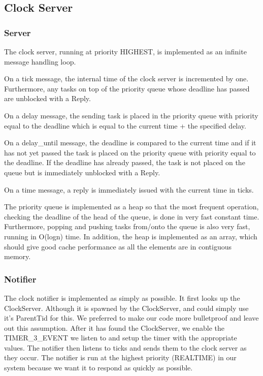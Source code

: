 \documentclass{article}
\begin{document}
\subsection{Clock Server}

\subsubsection{Server}
The clock server, running at priority HIGHEST, is implemented as an infinite message handling loop. 

On a tick message, the internal time of the clock server is incremented by one. Furthermore, any tasks on top of the priority queue whose deadline has passed are unblocked with a Reply.

On a delay message, the sending task is placed in the priority queue with priority equal to the deadline which is equal to the current time + the specified delay.

On a delay\_until message, the deadline is compared to the current time and if it has not yet passed the task is placed on the priority queue with priority equal to the deadline. If the deadline has already passed, the task is not placed on the queue but is immediately unblocked with a Reply.

On a time message, a reply is immediately issued with the current time in ticks.

The priority queue is implemented as a heap so that the most frequent operation, checking the deadline of the head of the queue, is done in very fast constant time. Furthermore, popping and pushing tasks from/onto the queue is also very fast, running in O(logn) time. In addition, the heap is implemented as an array, which should give good cache performance as all the elements are in contiguous memory.

\subsubsection{Notifier}

The clock notifier is implemented as simply as possible. It first looks up the ClockServer. Although it is spawned by the ClockServer, and could simply use it's ParentTid for this. We preferred to make our code more bulletproof and leave out this assumption. After it has found the ClockServer, we enable the TIMER\_3\_EVENT we listen to and setup the timer with the appropriate values. The notifier then listens to ticks and sends them to the clock server as they occur. The notifier is run at the highest priority (REALTIME) in our system because we want it to respond as quickly as possible.
\end{document}
